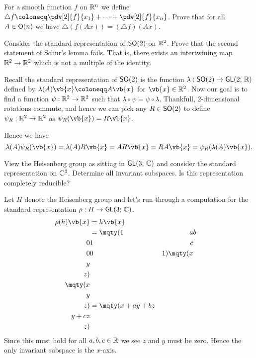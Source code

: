 \documentclass[
	pages,
	boxes,
	color=WildStrawberry
]{homework}
\begin{document}
\begin{problem}
For a smooth function $f$ on $\mathbb{R}^n$ we define $\triangle f \defeq \pdv[2]{f}{x_1} + \cdots + \pdv[2]{f}{x_n}$. Prove that for all $A \in \mathsf{O}(n)$ we have $\triangle (f(Ax)) = (\triangle f)(Ax)$.
\end{problem}

\begin{solution}

\end{solution}

\begin{problem}
Consider the standard representation of $\mathsf{SO}(2)$ on $\mathbb{R}^2$. Prove that the second statement of Schur's lemma fails. That is, there exists an intertwining map $\mathbb{R}^2 \to \mathbb{R}^2$ which is not a multiple of the identity.
\end{problem}

\begin{solution}
	Recall the standard representation of $\mathsf{SO}(2)$ is the function $\lambda:\mathsf{SO}(2)\to\mathsf{GL}(2;\, \mathbb{R})$ defined by $\lambda(A)\vb{x} \defeq A\vb{x}$ for $\vb{x}\in\R^2$. Now our goal is to find a function $\psi:\mathbb{R}^2\to\mathbb{R}^2$ such that $\lambda \circ \psi = \psi\circ \lambda$. Thankfull, 2-dimensional rotations commute, and hence we can pick any $R\in\mathsf{SO}(2)$ to define $\psi_R:\mathbb{R}^2\to \mathbb{R}^2$ as $\psi_R(\vb{x}) = R\vb{x}$.

	Hence we have
	\begin{equation*}
		\lambda(A)\psi_R(\vb{x}) = \lambda(A)R\vb{x} = AR\vb{x} = RA\vb{x} = \psi_R(\lambda(A)\vb{x}).
	\end{equation*}
\end{solution}

\begin{problem}
View the Heisenberg group as sitting in $\mathsf{GL}(3;\, \mathbb{C})$ and consider the standard representation on $\mathbb{C}^3$. Determine all invariant subspaces. Is this representation completely reducible?
\end{problem}

\begin{solution}
	Let $H$ denote the Heisenberg group and let's run through a computation for the standard representation $\rho: H \to \mathsf{GL}(3;\, \mathbb{C})$.
	\begin{align*}
		\rho(h)\vb{x} & = h\vb{x}         \\
		              & = \mqty(1 & a & b \\ 0 & 1 & c \\ 0 & 0 & 1)\mqty(x \\ y \\ z) \\
		\mqty(x                           \\ y \\ z) & = \mqty(x + ay + bz         \\ y + cz \\ z)
	\end{align*}
	Since this must hold for all $a, b, c \in \mathbb{R}$ we see $z$ and $y$ must be zero. Hence the only invariant subspace is the $x$-axis.
\end{solution}
\end{document}
